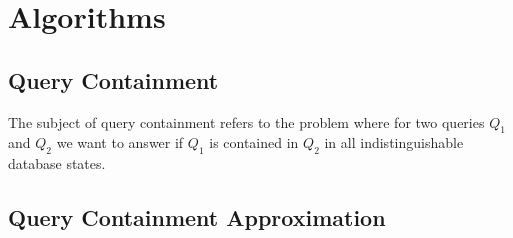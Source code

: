 \section{Algorithms}

\subsection{Query Containment}

The subject of query containment refers to the problem where for two queries $Q_1$ and $Q_2$ we want to answer if $Q_1$ is contained in $Q_2$ in all indistinguishable database states.
%
%

\subsection{Query Containment Approximation}

